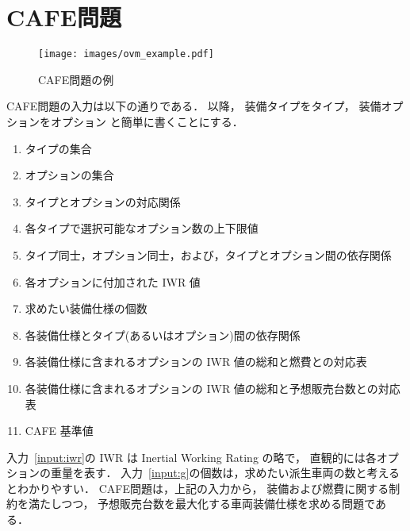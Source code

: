 \section{CAFE問題}\label{sec:background}

\begin{figure*}[t]
  \centering
  \texttt{[image: images/ovm\_example.pdf]}
  \caption{CAFE問題の例}
  \label{fig:ovm_example}
\end{figure*}

CAFE問題の入力は以下の通りである．
以降，
装備タイプをタイプ，
装備オプションをオプション
と簡単に書くことにする．
\begin{enumerate}
\item タイプの集合\label{input:vp}
\item オプションの集合\label{input:v}
\item タイプとオプションの対応関係\label{input:vp-v}
\item 各タイプで選択可能なオプション数の上下限値\label{input:ublb}
\item タイプ同士，オプション同士，および，タイプとオプション間の依存関係
  \label{input:dependency}
\item 各オプションに付加された IWR 値\label{input:iwr}
\item 求めたい装備仕様の個数\label{input:g}
\item 各装備仕様とタイプ(あるいはオプション)間の依存関係\label{input:init}
\item 各装備仕様に含まれるオプションの IWR 値の総和と燃費との対応表\label{input:fe}
\item 各装備仕様に含まれるオプションの IWR 値の総和と予想販売台数との対応表\label{input:sv}
\item CAFE 基準値\label{input:cafe}
\end{enumerate}
入力~\ref{input:iwr}の IWR は Inertial Working Rating の略で，
直観的には各オプションの重量を表す．
入力~\ref{input:g}の個数は，求めたい派生車両の数と考えるとわかりやすい．
CAFE問題は，上記の入力から，
装備および燃費に関する制約を満たしつつ，
予想販売台数を最大化する車両装備仕様を求める問題である．

